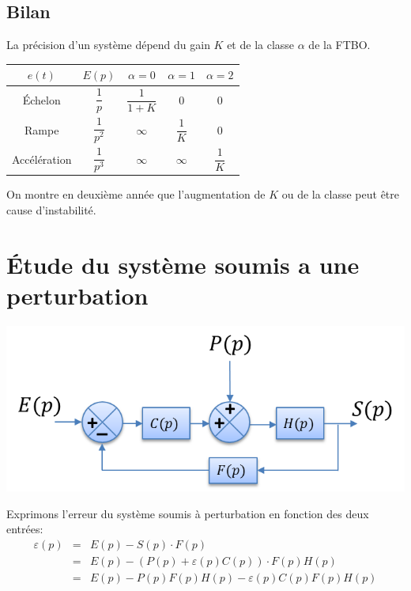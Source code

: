 \documentclass[10pt,fleqn]{article} %
\begin{document}
\newpage 

\subsection{Bilan}

\begin{resultat}
La précision d'un système dépend du gain $K$ et de la classe $\alpha$ de la FTBO. 
\begin{center}
\begin{tabular}{|c|c|c|c|c|}
\hline
$e(t)$ & $E(p)$ & $\alpha=0$ & $\alpha=1 $ & $\alpha=2$ \\
\hline
Échelon & $\dfrac{1}{p}$ & $\dfrac{1}{1+K}$ & 0 & 0 \\
\hline
Rampe & $\dfrac{1}{p^2}$ & $\infty$ & $\dfrac{1}{K}$ & 0 \\
\hline
Accélération & $\dfrac{1}{p^3}$ & $\infty$ & $\infty$ & $\dfrac{1}{K}$ \\
\hline
\end{tabular}
\end{center}
\end{resultat}

\begin{rem}
On montre en deuxième année que l'augmentation de $K$ ou de la classe peut être cause d'instabilité.
\end{rem}


\section{Étude du système soumis a une perturbation}
\begin{center}
\includegraphics[width=.5\textwidth]{images/bloc1.png}
\end{center}

Exprimons l'erreur du système soumis à perturbation en fonction des deux entrées:
\begin{eqnarray*}
\varepsilon(p) 
&=& E(p)-S(p)\cdot F(p) \\
&=& E(p)-\left(P(p)+\varepsilon(p)C(p)\right)\cdot F(p)H(p) \\
&=& E(p)-P(p)F(p)H(p)-\varepsilon(p)C(p)F(p)H(p) \\
\end{eqnarray*}
\end{document}
